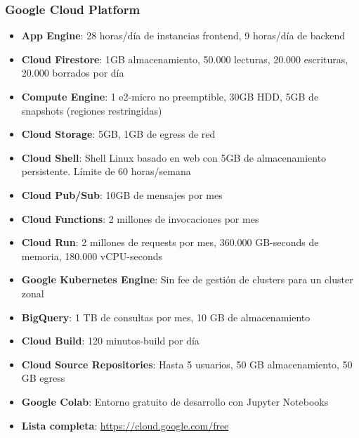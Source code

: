 \subsubsection*{Google Cloud Platform}
\begin{itemize}
	\item \textbf{App Engine}: 28 horas/día de instancias frontend, 9 horas/día de backend
	\item \textbf{Cloud Firestore}: 1GB almacenamiento, 50.000 lecturas, 20.000 escrituras, 20.000 borrados por día
	\item \textbf{Compute Engine}: 1 e2-micro no preemptible, 30GB HDD, 5GB de snapshots (regiones restringidas)
	\item \textbf{Cloud Storage}: 5GB, 1GB de egress de red
	\item \textbf{Cloud Shell}: Shell Linux basado en web con 5GB de almacenamiento persistente. Límite de 60 horas/semana
	\item \textbf{Cloud Pub/Sub}: 10GB de mensajes por mes
	\item \textbf{Cloud Functions}: 2 millones de invocaciones por mes
	\item \textbf{Cloud Run}: 2 millones de requests por mes, 360.000 GB-seconds de memoria, 180.000 vCPU-seconds
	\item \textbf{Google Kubernetes Engine}: Sin fee de gestión de clusters para un cluster zonal
	\item \textbf{BigQuery}: 1 TB de consultas por mes, 10 GB de almacenamiento
	\item \textbf{Cloud Build}: 120 minutos-build por día
	\item \textbf{Cloud Source Repositories}: Hasta 5 usuarios, 50 GB almacenamiento, 50 GB egress
	\item \textbf{Google Colab}: Entorno gratuito de desarrollo con Jupyter Notebooks
	\item \textbf{Lista completa}: \url{https://cloud.google.com/free}
\end{itemize}

